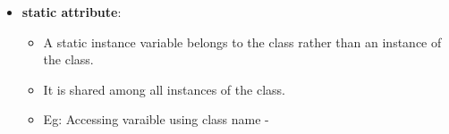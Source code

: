 \begin{flushleft}
\begin{itemize}
		\item \textbf{static attribute}:
		\begin{itemize}
			\item A static instance variable belongs to the class rather than an instance of the class. 
			\item It is shared among all instances of the class.
			\item Eg: Accessing varaible using class name -
			\bigskip
			\bigskip
		\end{itemize}
		\newpage
		

\end{itemize}
\end{flushleft}
